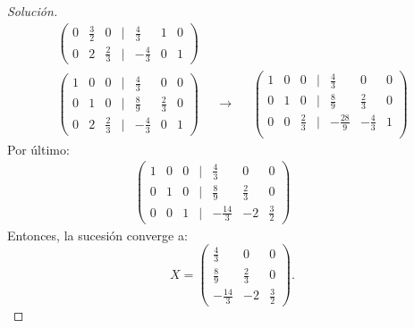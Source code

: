 \documentclass[12pt]{book}
\newenvironment{solucion}
  {\renewcommand\qedsymbol{$\square$}\begin{proof}[Solución]}
  {\end{proof}}
\begin{document}
\begin{solucion}
\begin{align*}
\begin{pmatrix}
    0 & \frac{3}{2} & 0 & | & \frac{4}{3} & 1 & 0\\
    0 & 2 & \frac{2}{3} & | & -\frac{4}{3} & 0 & 1
    \end{pmatrix}\\[8pt]
    \begin{pmatrix}
    1 & 0 & 0 & | & \frac{4}{3} & 0 & 0\\
    0 & 1 & 0 & | & \frac{8}{9} & \frac{2}{3} & 0\\
    0 & 2 & \frac{2}{3} & | & -\frac{4}{3} & 0 & 1
    \end{pmatrix}& &\rightarrow & &\begin{pmatrix}
    1 & 0 & 0 & | & \frac{4}{3} & 0 & 0\\
    0 & 1 & 0 & | & \frac{8}{9} & \frac{2}{3} & 0\\
    0 & 0 & \frac{2}{3} & | & -\frac{28}{9} & -\frac{4}{3} & 1\\
    \end{pmatrix}
\end{align*}
Por último:
\begin{align*}
    \begin{pmatrix}
        1 & 0 & 0 & | & \frac{4}{3} & 0 & 0\\
        0 & 1 & 0 & | & \frac{8}{9} & \frac{2}{3} & 0\\
        0 & 0 & 1 & | & -\frac{14}{3} & -2 & \frac{3}{2}
    \end{pmatrix} & & & &
\end{align*}
Entonces, la sucesión converge a:
\[
X=\begin{pmatrix}
    \frac{4}{3} & 0 & 0\\
    \frac{8}{9} & \frac{2}{3} & 0\\
    -\frac{14}{3} & -2 & \frac{3}{2}
    \end{pmatrix}.
\]
\end{solucion}
\end{document}
